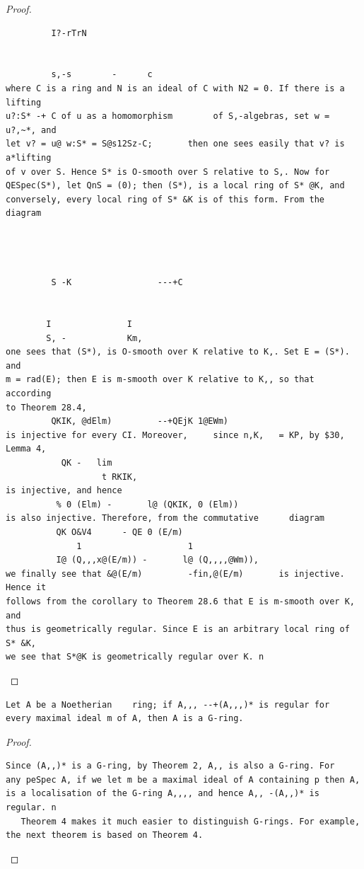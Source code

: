\begin{proof}
\begin{verbatim}
         I?-rTrN


         s,-s        -      c
where C is a ring and N is an ideal of C with N2 = 0. If there is a lifting
u?:S* -+ C of u as a homomorphism        of S,-algebras, set w = u?,~*, and
let v? = u@ w:S* = S@s12Sz-C;       then one sees easily that v? is a*lifting
of v over S. Hence S* is O-smooth over S relative to S,. Now for
QESpec(S*), let QnS = (0); then (S*), is a local ring of S* @K, and
conversely, every local ring of S* &K is of this form. From the diagram




         S -K                 ---+C


        I               I
        S, -            Km,
one sees that (S*), is O-smooth over K relative to K,. Set E = (S*). and
m = rad(E); then E is m-smooth over K relative to K,, so that according
to Theorem 28.4,
         QKIK, @dElm)         --+QEjK 1@EWm)
is injective for every CI. Moreover,     since n,K,   = KP, by $30, Lemma 4,
           QK -   lim
                   t RKIK,
is injective, and hence
          % 0 (Elm) -       l@ (QKIK, 0 (Elm))
is also injective. Therefore, from the commutative      diagram
          QK O&V4      - QE 0 (E/m)
              1                     1
          I@ (Q,,,x@(E/m)) -       l@ (Q,,,,@Wm)),
we finally see that &@(E/m)         -fin,@(E/m)       is injective. Hence it
follows from the corollary to Theorem 28.6 that E is m-smooth over K, and
thus is geometrically regular. Since E is an arbitrary local ring of S* &K,
we see that S*@K is geometrically regular over K. n
\end{verbatim}
\end{proof}


\begin{theorem}\label{mcrt-auto-theorem-32-4}\uses{}
\begin{verbatim}
Let A be a Noetherian    ring; if A,,, --+(A,,,)* is regular for
every maximal ideal m of A, then A is a G-ring.
\end{verbatim}
\end{theorem}
\begin{proof}
\begin{verbatim}
Since (A,,)* is a G-ring, by Theorem 2, A,, is also a G-ring. For
any peSpec A, if we let m be a maximal ideal of A containing p then A,
is a localisation of the G-ring A,,,, and hence A,, -(A,,)* is regular. n
   Theorem 4 makes it much easier to distinguish G-rings. For example,
the next theorem is based on Theorem 4.
\end{verbatim}
\end{proof}


